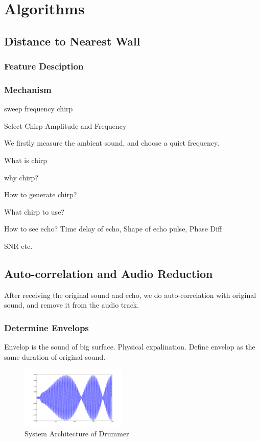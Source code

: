 \section{Algorithms}
\label{sec:algo}



\subsection{Distance to Nearest Wall}
\subsubsection{Feature Desciption}

\subsubsection{Mechanism}


sweep frequency chirp


Select Chirp Amplitude and Frequency

We firstly measure the ambient sound, and choose a quiet frequency.


What is chirp


why chirp?


How to generate chirp?


What chirp to use?


How to see echo? Time delay of echo, Shape of echo pulse, Phase Diff


SNR etc.



\subsection{Auto-correlation and Audio Reduction}

After receiving the original sound and echo, we do auto-correlation with original sound,
and remove it from the audio track.



\subsubsection{Determine Envelops}

Envelop is the sound of big surface. Physical expalination. 
Define envelop as the same duration of original sound.

\begin{figure}[H]
\centering
\includegraphics[width=0.45\textwidth]{./fig/40cm.pdf}
\caption{System Architecture of Drummer}
\end{figure}

